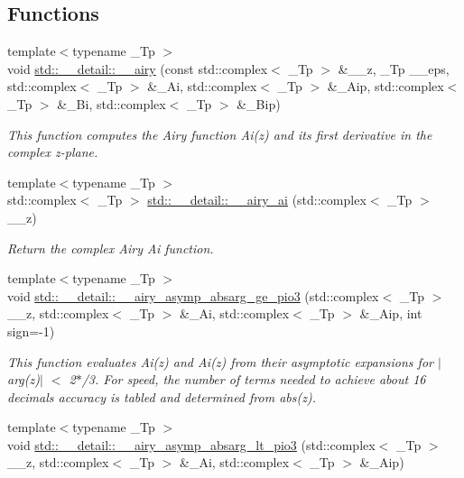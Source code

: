 \subsection*{Functions}
\begin{DoxyCompactItemize}
\item 
{\footnotesize template$<$typename \+\_\+\+Tp $>$ }\\void \hyperlink{namespacestd_1_1____detail_a6817269a446ea93bb50e7438e27c1162}{std\+::\+\_\+\+\_\+detail\+::\+\_\+\+\_\+airy} (const std\+::complex$<$ \+\_\+\+Tp $>$ \&\+\_\+\+\_\+z, \+\_\+\+Tp \+\_\+\+\_\+eps, std\+::complex$<$ \+\_\+\+Tp $>$ \&\+\_\+\+Ai, std\+::complex$<$ \+\_\+\+Tp $>$ \&\+\_\+\+Aip, std\+::complex$<$ \+\_\+\+Tp $>$ \&\+\_\+\+Bi, std\+::complex$<$ \+\_\+\+Tp $>$ \&\+\_\+\+Bip)
\begin{DoxyCompactList}\small\item\em This function computes the Airy function Ai(z) and its first derivative in the complex z-\/plane. \end{DoxyCompactList}\item 
{\footnotesize template$<$typename \+\_\+\+Tp $>$ }\\std\+::complex$<$ \+\_\+\+Tp $>$ \hyperlink{namespacestd_1_1____detail_afd48b5702344f832a250922ac4ffb917}{std\+::\+\_\+\+\_\+detail\+::\+\_\+\+\_\+airy\+\_\+ai} (std\+::complex$<$ \+\_\+\+Tp $>$ \+\_\+\+\_\+z)
\begin{DoxyCompactList}\small\item\em Return the complex Airy Ai function. \end{DoxyCompactList}\item 
{\footnotesize template$<$typename \+\_\+\+Tp $>$ }\\void \hyperlink{namespacestd_1_1____detail_ac3f140083eafeac7123894c55d8383b9}{std\+::\+\_\+\+\_\+detail\+::\+\_\+\+\_\+airy\+\_\+asymp\+\_\+absarg\+\_\+ge\+\_\+pio3} (std\+::complex$<$ \+\_\+\+Tp $>$ \+\_\+\+\_\+z, std\+::complex$<$ \+\_\+\+Tp $>$ \&\+\_\+\+Ai, std\+::complex$<$ \+\_\+\+Tp $>$ \&\+\_\+\+Aip, int sign=-\/1)
\begin{DoxyCompactList}\small\item\em This function evaluates Ai(z) and Ai\textquotesingle{}(z) from their asymptotic expansions for $\vert$arg(z)$\vert$ $<$ 2$\ast$/3. For speed, the number of terms needed to achieve about 16 decimals accuracy is tabled and determined from abs(z). \end{DoxyCompactList}\item 
{\footnotesize template$<$typename \+\_\+\+Tp $>$ }\\void \hyperlink{namespacestd_1_1____detail_a4f1c33b398ae69c55281341004da0679}{std\+::\+\_\+\+\_\+detail\+::\+\_\+\+\_\+airy\+\_\+asymp\+\_\+absarg\+\_\+lt\+\_\+pio3} (std\+::complex$<$ \+\_\+\+Tp $>$ \+\_\+\+\_\+z, std\+::complex$<$ \+\_\+\+Tp $>$ \&\+\_\+\+Ai, std\+::complex$<$ \+\_\+\+Tp $>$ \&\+\_\+\+Aip)

\end{DoxyCompactItemize}
